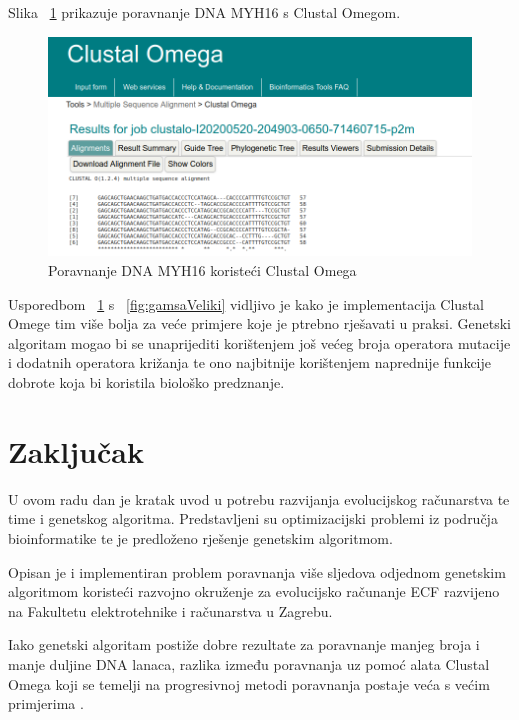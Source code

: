 \documentclass[times, utf8, zavrsni, numeric]{fer}
\begin{document}
Slika ~\ref{fig:clustalVeliki} prikazuje poravnanje DNA MYH16 s Clustal Omegom.  

\begin{figure}[]
	\includegraphics[]{slike/clustalVeliki.PNG}
	\centering
	\caption{Poravnanje DNA MYH16 koristeći Clustal Omega}
	\label{fig:clustalVeliki}
\end{figure}

Usporedbom ~\ref{fig:clustalVeliki} s ~\ref{fig:gamsaVeliki} vidljivo je kako je implementacija Clustal Omege tim više bolja za veće primjere koje je ptrebno rješavati u praksi. 
Genetski algoritam mogao bi se unaprijediti korištenjem još većeg broja operatora mutacije i dodatnih operatora križanja te ono najbitnije korištenjem naprednije funkcije dobrote koja bi koristila biološko predznanje.

\chapter{Zaključak} \label{zakljucak}
U ovom radu dan je kratak uvod u potrebu razvijanja evolucijskog računarstva te time i genetskog algoritma. Predstavljeni su optimizacijski problemi iz područja bioinformatike te je predloženo rješenje genetskim algoritmom.

Opisan je i implementiran problem poravnanja više sljedova odjednom genetskim algoritmom koristeći razvojno okruženje za evolucijsko računanje ECF razvijeno na Fakultetu elektrotehnike i računarstva u Zagrebu.

Iako genetski algoritam postiže dobre rezultate za poravnanje manjeg broja i manje duljine DNA lanaca, razlika između poravnanja uz pomoć alata Clustal Omega koji se temelji na progresivnoj metodi poravnanja postaje veća s većim primjerima .~\nocite{*}




\end{document}
